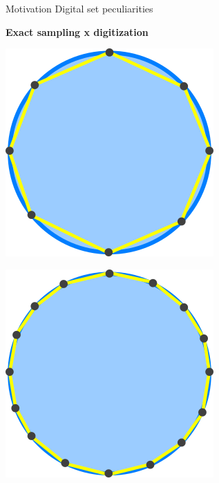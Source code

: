 \begin{frame}
{Motivation}
{Digital set peculiarities}

\textbf{Exact sampling x digitization}

\begin{minipage}{0.3\textwidth}
\center
\includegraphics[scale=0.45]{figures/motivation/exact-sampling/sampling-0.png}
\end{minipage}
\begin{minipage}{0.3\textwidth}
\center
\includegraphics[scale=0.45]{figures/motivation/exact-sampling/sampling-1.png}
\end{minipage}
\begin{minipage}{0.3\textwidth}
\center

\end{minipage}
\end{frame}
